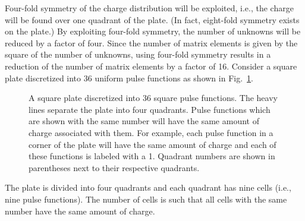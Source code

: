 Four-fold symmetry of the charge distribution will be exploited, i.e.,
the charge will be found over one quadrant of the plate.  (In fact,
eight-fold symmetry exists on the plate.)  By exploiting four-fold
symmetry, the number of unknowns will be reduced by a factor of four.
Since the number of matrix elements is given by the square of the
number of unknowns, using four-fold symmetry results in a reduction of
the number of matrix elements by a factor of 16.  Consider a square
plate discretized into 36 uniform pulse functions as shown in Fig.\
\ref{fig:symmetryGeom}.
\begin{figure}
  \begin{center}
  \end{center} \caption{A square plate discretized into 36 square
  pulse functions.  The heavy lines separate the plate into four
  quadrants.  Pulse functions which are shown with the same number
  will have the same amount of charge associated with them.  For
  example, each pulse function in a corner of the plate will have the
  same amount of charge and each of these functions is labeled
  with a 1.  Quadrant numbers are shown in parentheses next to their
  respective quadrants.}   \label{fig:symmetryGeom}
\end{figure}
The plate is divided into four quadrants and each quadrant has nine
cells (i.e., nine pulse functions).  The number of cells is such that
all cells with the same number have the same amount of charge.

